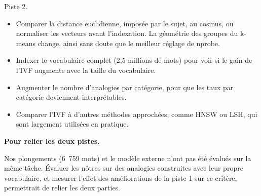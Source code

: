 \documentclass[11pt,a4paper]{article}
\begin{document}
Piste 2.

\begin{itemize}

\item Comparer la distance euclidienne, imposée par le sujet, au cosinus, ou normaliser les vecteurs avant l’indexation. La géométrie des groupes du k-means change, ainsi sans doute que le meilleur réglage de nprobe.

\item Indexer le vocabulaire complet (2,5 millions de mots) pour voir si le gain de l’IVF augmente avec la taille du vocabulaire.

\item Augmenter le nombre d’analogies par catégorie, pour que les taux par catégorie deviennent interprétables.

\item Comparer l’IVF à d’autres méthodes approchées, comme HNSW ou LSH, qui sont largement utilisées en pratique.

\end{itemize}

\textbf{Pour relier les deux pistes.}\nopagebreak

Nos plongements (6~759 mots) et le modèle externe n’ont pas été évalués sur la même tâche. Évaluer les nôtres sur des analogies construites avec leur propre vocabulaire, et mesurer l’effet des améliorations de la piste 1 sur ce critère, permettrait de relier les deux parties.
\end{document}
